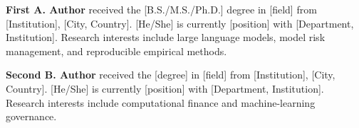 \documentclass[10pt,twocolumn]{article}
\begin{document}
\vspace{1em}
\noindent\textbf{First A. Author} received the [B.S./M.S./Ph.D.] degree in [field] from [Institution], [City, Country]. [He/She] is currently [position] with [Department, Institution]. Research interests include large language models, model risk management, and reproducible empirical methods.

\vspace{0.4em}
\noindent\textbf{Second B. Author} received the [degree] in [field] from [Institution], [City, Country]. [He/She] is currently [position] with [Department, Institution]. Research interests include computational finance and machine-learning governance.
\end{document}
